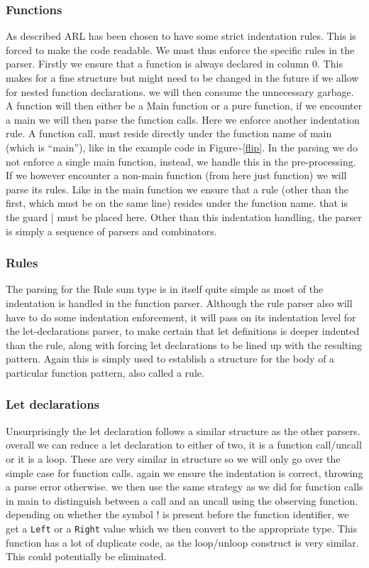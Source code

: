 \documentclass[a4paper]{article}
\begin{document}
\subsubsection{Functions}
\label{sec:org18bf185}
As described ARL has been chosen to have some strict indentation rules. This is forced to make the code readable. We must thus enforce the specific rules in the parser. Firstly we ensure that a function is always declared in column 0. This makes for a fine structure but might need to be changed in the future if we allow for nested function declarations. we will then consume the unnecessary garbage. A function will then either be a Main function or a pure function, if we encounter a main we will then parse the function calls. Here we enforce another indentation rule. A function call, must reside directly under the function name of main (which is ``main''), like in the example code in Figure\textasciitilde{}\ref{flip}. In the parsing we do not enforce a single main function, instead, we handle this in the pre-processing.
If we however encounter a non-main function (from here just function) we will parse its rules. Like in the main function we ensure that a rule (other than the first, which must be on the same line) resides under the function name. that is the guard | must be placed here. Other than this indentation handling, the parser is simply a sequence of parsers and combinators.
\subsubsection{Rules}
\label{sec:org823f1f2}
The parsing for the Rule sum type is in itself quite simple as most of the indentation is handled in the function parser. Although the rule parser also will have to do some indentation enforcement, it will pass on its indentation level for the let-declarations parser, to make certain that let definitions is deeper indented than the rule, along with forcing let declarations to be lined up with the resulting pattern. Again this is simply used to establish a structure for the body of a particular function pattern, also called a rule.
\subsubsection{Let declarations}
\label{sec:orgc027d6f}
Unsurprisingly the let declaration follows a similar structure as the other parsers. overall we can reduce a let declaration to either of two, it is a function call/uncall or it is a loop. These are very similar in structure so we will only go over the simple case for function calls. again we ensure the indentation is correct, throwing a parse error otherwise. we then use the same strategy as we did for function calls in main to distinguish between a call and an uncall using the observing function. depending on whether the symbol ! is present before the function identifier, we get a \texttt{Left} or a \texttt{Right} value which we then convert to the appropriate type.
This function has a lot of duplicate code, as the loop/unloop construct is very similar. This could potentially be eliminated.
\end{document}
